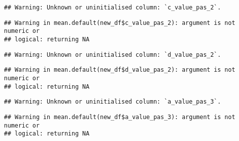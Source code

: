 \documentclass[
]{article}
\newenvironment{Shaded}{\begin{snugshade}}{\end{snugshade}}
\newcommand{\FunctionTok}[1]{\textcolor[rgb]{0.00,0.00,0.00}{#1}}
\newcommand{\NormalTok}[1]{#1}
\newcommand{\OtherTok}[1]{\textcolor[rgb]{0.56,0.35,0.01}{#1}}
\newcommand{\SpecialCharTok}[1]{\textcolor[rgb]{0.00,0.00,0.00}{#1}}
\begin{document}
\begin{verbatim}
## Warning: Unknown or uninitialised column: `c_value_pas_2`.
\end{verbatim}

\begin{verbatim}
## Warning in mean.default(new_df$c_value_pas_2): argument is not numeric or
## logical: returning NA
\end{verbatim}

\begin{Shaded}
\end{Shaded}

\begin{verbatim}
## Warning: Unknown or uninitialised column: `d_value_pas_2`.
\end{verbatim}

\begin{verbatim}
## Warning in mean.default(new_df$d_value_pas_2): argument is not numeric or
## logical: returning NA
\end{verbatim}

\begin{Shaded}
\end{Shaded}

\begin{verbatim}
## Warning: Unknown or uninitialised column: `a_value_pas_3`.
\end{verbatim}

\begin{verbatim}
## Warning in mean.default(new_df$a_value_pas_3): argument is not numeric or
## logical: returning NA
\end{verbatim}

\begin{Shaded}
\end{Shaded}
\end{document}
